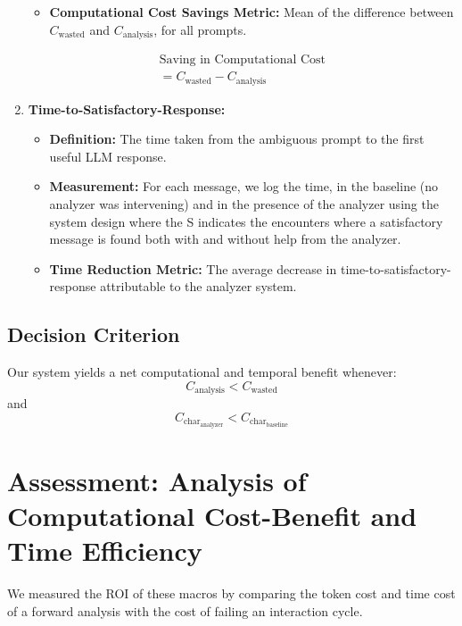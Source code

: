 \documentclass[11pt,a4paper]{article}
\begin{document}
\begin{enumerate}
\begin{itemize}
        \item \textbf{Computational Cost Savings Metric:}
        Mean of the difference between \(C_{\text{wasted}}\) and \(C_{\text{analysis}}\), for all prompts.
    \end{itemize}
        \begin{equation}
        \begin{aligned}
        \text{Saving in Computational Cost} \\
        = C_{\text{wasted}} - C_{\text{analysis}}
        \end{aligned}
        \end{equation}
    
    \item \textbf{Time-to-Satisfactory-Response:}
    \begin{itemize}
        \item \textbf{Definition:}
        The time taken from the ambiguous prompt to the first useful LLM response.
        \item \textbf{Measurement:}
        For each message, we log the time, in the baseline (no analyzer was intervening) and in the presence of the analyzer using the system design where the S indicates the encounters where a satisfactory message is found both with and without help from the analyzer.
        \item \textbf{Time Reduction Metric:}
        The average decrease in time-to-satisfactory-response attributable to the analyzer system.  
    \end{itemize}
\end{enumerate}

\subsection{Decision Criterion}
Our system yields a net computational and temporal benefit whenever:
\begin{equation}
C_{\text{analysis}} < C_{\text{wasted}}
\end{equation}
and
\begin{equation}
C_{\text{char}_{\text{analyzer}}} < C_{\text{char}_{\text{baseline}}}
\end{equation}

\section{Assessment: Analysis of Computational Cost-Benefit and Time Efficiency}
We measured the ROI of these macros by comparing the token cost and time cost of a forward analysis with the cost of failing an interaction cycle.
\end{document}
